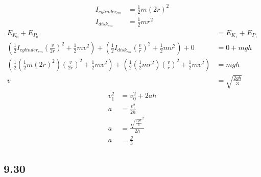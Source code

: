 \documentclass{article}
\begin{document}
\begin{align*}
	I_{cylinder_{cm}} & = \frac{1}{2}m(2r)^2 \\
	I_{disk_{cm}} & = \frac{1}{2}mr^2
\end{align*}
\begin{align*}
	E_{K_0} + E_{P_0} & = E_{K_1} + E_{P_1} \\
	\left( \frac{1}{2}I_{cylinder_{cm}} \left( \frac{v}{2r} \right)^2 + \frac{1}{2}mv^2 \right) + \left( \frac{1}{2}I_{disk_{cm}} \left( \frac{v}{r} \right)^2 + \frac{1}{2}mv^2 \right) + 0 & = 0 + mgh \\
	\left( \frac{1}{2} \left( \frac{1}{2}m(2r)^2 \right) \left( \frac{v}{2r} \right)^2 + \frac{1}{2}mv^2 \right) + \left( \frac{1}{2} \left( \frac{1}{2}mr^2 \right) \left( \frac{v}{r} \right)^2 + \frac{1}{2}mv^2 \right) & = mgh \\
	v & = \sqrt{ \frac{ 2gh }{ 3 } }
\end{align*}
\begin{align*}
	v_1^2 & = v_0^2 + 2ah \\
	a & = \frac{ v_1^2 }{ 2h } \\
	a & = \frac{ \sqrt{ \frac{ 2gh }{ 3 } }^2 }{ 2h } \\
	a & = \frac{ g }{ 3 }
\end{align*}

\subsection{9.30}
\end{document}
